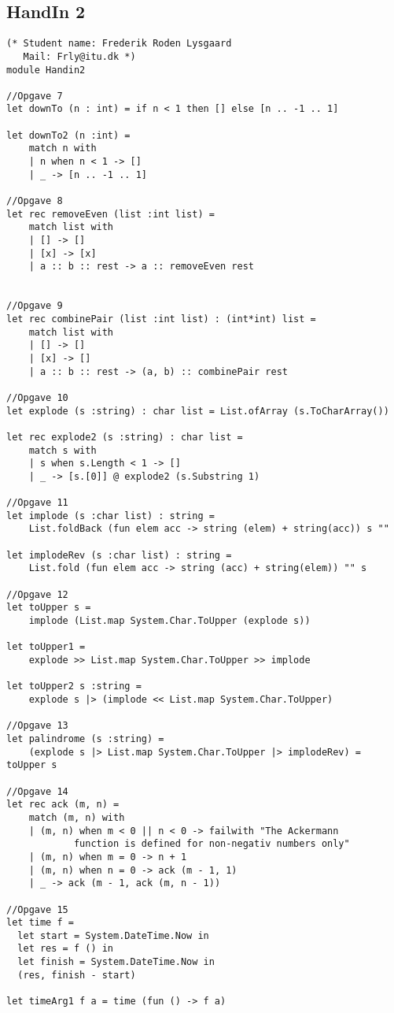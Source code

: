 \subsection{HandIn 2}
\label{Appendix_FSharp_Frederik_2}
\begin{lstlisting}
(* Student name: Frederik Roden Lysgaard
   Mail: Frly@itu.dk *)
module Handin2

//Opgave 7
let downTo (n : int) = if n < 1 then [] else [n .. -1 .. 1]

let downTo2 (n :int) = 
    match n with
    | n when n < 1 -> []
    | _ -> [n .. -1 .. 1]

//Opgave 8
let rec removeEven (list :int list) =
    match list with
    | [] -> []
    | [x] -> [x]
    | a :: b :: rest -> a :: removeEven rest


//Opgave 9
let rec combinePair (list :int list) : (int*int) list =
    match list with
    | [] -> []
    | [x] -> []
    | a :: b :: rest -> (a, b) :: combinePair rest

//Opgave 10
let explode (s :string) : char list = List.ofArray (s.ToCharArray())

let rec explode2 (s :string) : char list =
    match s with
    | s when s.Length < 1 -> []
    | _ -> [s.[0]] @ explode2 (s.Substring 1)

//Opgave 11
let implode (s :char list) : string = 
	List.foldBack (fun elem acc -> string (elem) + string(acc)) s ""

let implodeRev (s :char list) : string = 
	List.fold (fun elem acc -> string (acc) + string(elem)) "" s

//Opgave 12
let toUpper s = 
	implode (List.map System.Char.ToUpper (explode s))

let toUpper1 = 
	explode >> List.map System.Char.ToUpper >> implode

let toUpper2 s :string = 
	explode s |> (implode << List.map System.Char.ToUpper)

//Opgave 13
let palindrome (s :string) = 
	(explode s |> List.map System.Char.ToUpper |> implodeRev) = toUpper s

//Opgave 14
let rec ack (m, n) =
    match (m, n) with
    | (m, n) when m < 0 || n < 0 -> failwith "The Ackermann 
			function is defined for non-negativ numbers only"
    | (m, n) when m = 0 -> n + 1
    | (m, n) when n = 0 -> ack (m - 1, 1)
    | _ -> ack (m - 1, ack (m, n - 1))

//Opgave 15
let time f =
  let start = System.DateTime.Now in
  let res = f () in
  let finish = System.DateTime.Now in
  (res, finish - start)

let timeArg1 f a = time (fun () -> f a)
\end{lstlisting}

